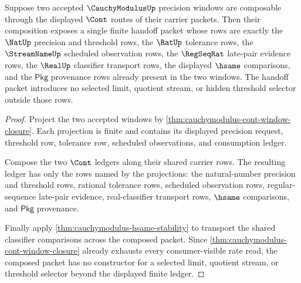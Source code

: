 \begin{theorem}
\label{thm:cauchymodulus-window-composition-handoff}
Suppose two accepted $\CauchyModulusUp$ precision windows are composable
through the displayed $\Cont$ routes of their carrier packets. Then their
composition exposes a single finite handoff packet whose rows are exactly the
$\NatUp$ precision and threshold rows, the $\RatUp$ tolerance rows, the
$\StreamNameUp$ scheduled observation rows, the $\RegSeqRat$ late-pair evidence
rows, the $\RealUp$ classifier transport rows, the displayed $\hsame$
comparisons, and the $\mathsf{Pkg}$ provenance rows already present in the two
windows. The handoff packet introduces no selected limit, quotient stream, or
hidden threshold selector outside those rows.
\end{theorem}
\begin{proof}
Project the two accepted windows by
\autoref{thm:cauchymodulus-cont-window-closure}. Each projection is finite and
contains its displayed precision request, threshold row, tolerance row,
scheduled observations, and consumption ledger.

Compose the two $\Cont$ ledgers along their shared carrier rows. The resulting
ledger has only the rows named by the projections: the natural-number
precision and threshold rows, rational tolerance rows, scheduled observation
rows, regular-sequence late-pair evidence, real-classifier transport rows,
$\hsame$ comparisons, and $\mathsf{Pkg}$ provenance.

Finally apply \autoref{thm:cauchymodulus-hsame-stability} to transport the
shared classifier comparisons across the composed packet. Since
\autoref{thm:cauchymodulus-cont-window-closure} already exhausts every
consumer-visible rate read, the composed packet has no constructor for a
selected limit, quotient stream, or threshold selector beyond the displayed
finite ledger.
\end{proof}

